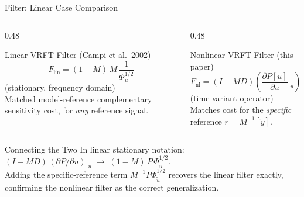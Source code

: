 \documentclass[aspectratio=169]{beamer}
\begin{document}
\begin{frame}{Filter: Linear Case Comparison}
  \begin{columns}[T]
    \begin{column}{0.48\textwidth}
      \begin{block}{Linear VRFT Filter (Campi et al.\ 2002)}
        \[
          F_{\mathrm{lin}} = (1-M)\,M\,\frac{1}{\Phi_u^{1/2}}
        \]
        (stationary, frequency domain)\\[0.4em]
        Matched model-reference complementary sensitivity cost, for \emph{any} reference signal.
      \end{block}
    \end{column}
    \begin{column}{0.48\textwidth}
      \begin{block}{Nonlinear VRFT Filter (this paper)}
        \[
          F_{\mathrm{nl}} = (I-MD)\left(\frac{\partial P[u]}{\partial u}\bigg|_{\tilde{u}}\right)
        \]
        (time-variant operator)\\[0.4em]
        Matches cost for the \emph{specific} reference $\tilde{r} = M^{-1}[\tilde{y}]$.
      \end{block}
    \end{column}
  \end{columns}
  \vspace{0.5em}
  \begin{exampleblock}{Connecting the Two}
    In linear stationary notation: $(I-MD)\,(\partial P/\partial u)|_{\tilde{u}} \;\to\; (1-M)\,P\,\Phi_{\tilde{u}}^{1/2}$.\\
    Adding the specific-reference term $M^{-1}P\Phi_{\tilde{u}}^{1/2}$ recovers the linear filter exactly, confirming the nonlinear filter as the correct generalization.
  \end{exampleblock}
\end{frame}
\end{document}
